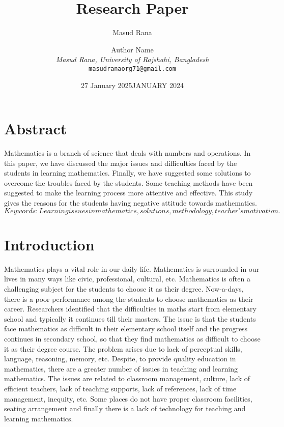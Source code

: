 \documentclass{article}
\title{Research Paper}
\author{Masud Rana}
\date{27 January 2025}
\begin{document}
\maketitle
\author{Author Name \\ \textit{Masud Rana, University of Rajshahi, Bangladesh} \\ \texttt{masudranaorg71@gmail.com}}
\date{JANUARY 2024}

\section{Abstract}
Mathematics is a branch of science that deals with numbers and operations. In this paper, we have discussed the major issues and difficulties faced by the students in learning mathematics. Finally, we have suggested some solutions to overcome the troubles faced by the students. Some teaching methods have been suggested to make the learning process more attentive and effective. This study gives the reasons for the students having negative attitude towards mathematics.
$Keywords: Learning issues in mathematics, solutions, methodology, teacher’s motivation.$

\section{Introduction}
Mathematics plays a vital role in our daily life. Mathematics is surrounded in our lives in many ways like civic, professional, cultural, etc. Mathematics is often a challenging subject for the students to choose it as their degree. Now-a-days, there is a poor performance among the students to choose mathematics as their career. Researchers identified that the difficulties in maths start from elementary school and typically it continues till their masters. The issue is that the students face mathematics as difficult in their elementary school itself and the progress continues in secondary school, so that they find mathematics as difficult to choose it as their degree course. The problem arises due to lack of perceptual skills, language, reasoning, memory, etc. Despite, to provide quality education in mathematics, there are a greater number of issues in teaching and learning mathematics. The issues are related to classroom management, culture, lack of efficient teachers, lack of teaching supports, lack of references, lack of time management, inequity, etc. Some places do not have proper classroom facilities, seating arrangement and finally there is a lack of technology for teaching and learning mathematics.
\cite{ayob2017factors}
\cite{abc}
\end{document}

